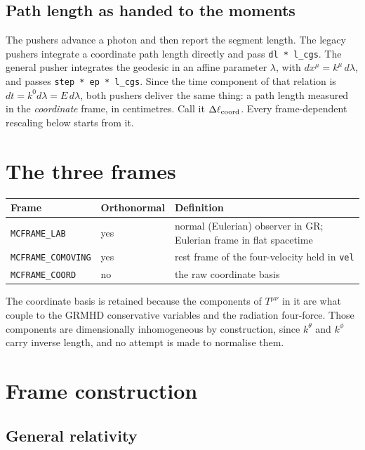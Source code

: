 \documentclass[11pt]{article}
\begin{document}
\subsection{Path length as handed to the moments}

The pushers advance a photon and then report the segment length. The legacy pushers
integrate a coordinate path length directly and pass \texttt{dl * l\_cgs}. The general
pusher integrates the geodesic in an affine parameter $\lambda$, with
$dx^\mu = k^\mu \, d\lambda$, and passes \texttt{step * ep * l\_cgs}. Since the time
component of that relation is $dt = k^0 d\lambda = E\, d\lambda$, both pushers deliver the
same thing: a path length measured in the \emph{coordinate} frame, in centimetres. Call it
$\Delta \ell_{\rm coord}$. Every frame-dependent rescaling below starts from it.

\section{The three frames}

\begin{table}[h]
\centering
\begin{tabular}{lll}
\toprule
Frame & Orthonormal & Definition \\
\midrule
\texttt{MCFRAME\_LAB}      & yes & normal (Eulerian) observer in GR; Eulerian frame in flat spacetime \\
\texttt{MCFRAME\_COMOVING} & yes & rest frame of the four-velocity held in \texttt{vel} \\
\texttt{MCFRAME\_COORD}    & no  & the raw coordinate basis \\
\bottomrule
\end{tabular}
\end{table}

The coordinate basis is retained because the components of $T^{\mu\nu}$ in it are what
couple to the GRMHD conservative variables and the radiation four-force. Those components
are dimensionally inhomogeneous by construction, since $k^\theta$ and $k^\phi$ carry
inverse length, and no attempt is made to normalise them.

\section{Frame construction}

\subsection{General relativity}
\end{document}
